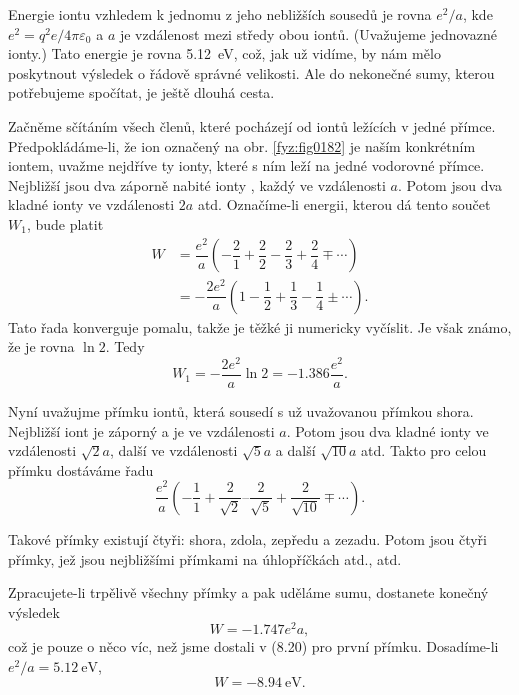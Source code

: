     Energie iontu vzhledem k jednomu z jeho nebližších sousedů je rovna \(e^2/a\), kde
    \(e^2=q^2e/4π\varepsilon_0\) a \(a\) je vzdálenost mezi středy obou iontů. (Uvažujeme jednovazné
    ionty.) Tato energie je rovna \SI{5.12}{\electronvolt}, což, jak už vidíme, by nám mělo
    poskytnout výsledek o řádově správné velikosti. Ale do nekonečné sumy, kterou potřebujeme
    spočítat, je ještě dlouhá cesta.

    Začněme sčítáním všech členů, které pocházejí od iontů ležících v jedné přímce.
    Předpokládáme-li, že ion označený  na obr. \ref{fyz:fig0182} je naším konkrétním iontem,
    uvažme nejdříve ty ionty, které s ním leží na jedné vodorovné přímce. Nejbližší jsou dva záporně
    nabité ionty , každý ve vzdálenosti \(a\). Potom jsou dva kladné ionty ve vzdálenosti
    \(2a\) atd. Označíme-li energii, kterou dá tento součet \(W_1\), bude platit
    \begin{align*}
      W &= \dfrac{e^2}{a}\left(−\dfrac{2}{1}+\dfrac{2}{2}−\dfrac{2}{3}+\dfrac{2}{4}∓\cdots\right) \\
        &=−\dfrac{2e^2}{a}\left(1−\dfrac{1}{2}+\dfrac{1}{3}−\dfrac{1}{4}±\cdots\right).
    \end{align*}
    Tato řada konverguje pomalu, takže je těžké ji numericky vyčíslit. Je však známo, že je rovna
    \(\ln2\). Tedy
    \begin{equation}\label{fyz:eq886}
      W_1=−\dfrac{2e^2}{a}\ln2=−\num{1.386}\dfrac{e^2}{a}.
    \end{equation}

    Nyní uvažujme přímku iontů, která sousedí s už uvažovanou přímkou shora. Nejbližší iont je
    záporný a je ve vzdálenosti \(a\). Potom jsou dva kladné ionty ve vzdálenosti \(\sqrt{2}a\),
    další ve vzdálenosti \(\sqrt{5}a\) a další \(\sqrt{10}a\) atd. Takto pro celou přímku dostáváme
    řadu
    \begin{equation}\label{fyz:eq887}
      \dfrac{e^2}{a}\left(−\dfrac{1}{1}+\dfrac{2}{\sqrt{2}}
                          –\dfrac{2}{\sqrt{5}}+\dfrac{2}{\sqrt{10}}∓\cdots
                    \right).
    \end{equation}

    Takové přímky existují čtyři: shora, zdola, zepředu a zezadu. Potom jsou čtyři přímky, jež jsou
    nejbližšími přímkami na úhlopříčkách atd., atd.

    Zpracujete-li trpělivě všechny přímky a pak uděláme sumu, dostanete konečný výsledek
    \begin{equation*}
      W=−\num{1.747}e^2a,
    \end{equation*}
    což je pouze o něco víc, než jsme dostali v (8.20) pro první přímku. Dosadíme-li \(e^2/a =
    \SI{5.12}{\electronvolt}\), 
    \begin{equation*}
      W=−\SI{8.94}{\electronvolt}.
    \end{equation*}

